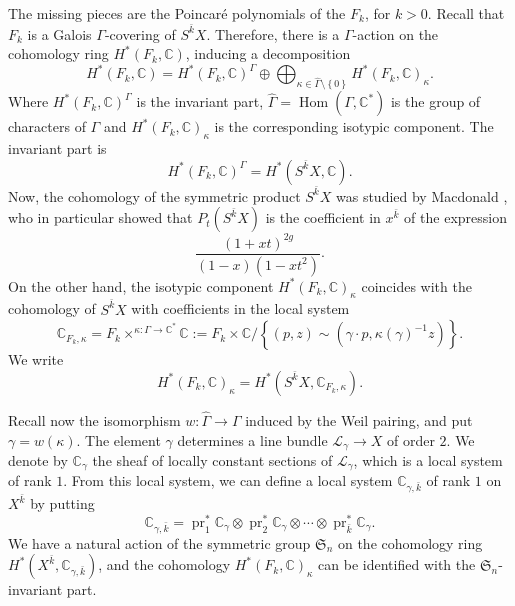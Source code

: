 \documentclass[12pt,a4paper]{amsbook}
\theoremstyle{remark} \newtheorem{rmk}[thm]{Remark}
\theoremstyle{definition} \newtheorem{defn}[thm]{Definition}
\theoremstyle{definition} \newtheorem{ex}[thm]{Example}
\theoremstyle{definition} \newtheorem{ej}{Exercise}
\newcommand{\C}{\mathbb C}
\newcommand{\sL}{\mathscr L}
\DeclareMathOperator{\Hom}{Hom}
\DeclareMathOperator{\pr}{pr}
\begin{document}
The missing pieces are the Poincaré polynomials of the $F_k$, for $k>0$. Recall that $F_k$ is a Galois $\Gamma$-covering of $S^{\bar{k}}X$. Therefore, there is a $\Gamma$-action on the cohomology ring $H^*(F_k,\C)$, inducing a decomposition
\begin{equation*}
H^*(F_k, \C) = H^*(F_k,\C)^\Gamma \oplus \bigoplus_{\kappa \in \hat{\Gamma}\setminus \left\{ 0 \right\}} H^*(F_k,\C)_{\kappa}.
\end{equation*}
Where $H^*(F_k,\C)^\Gamma$ is the invariant part, $\hat{\Gamma}=\Hom(\Gamma,\C^*)$ is the group of characters of $\Gamma$ and $H^*(F_k,\C)_{\kappa}$ is the corresponding isotypic component. The invariant part is
\begin{equation*}
H^*(F_k,\C)^\Gamma = H^*(S^{\bar{k}}X,\C).
\end{equation*}
Now, the cohomology of the symmetric product $S^{\bar{k}}X$ was studied by Macdonald \cite{Macdonald}, who in particular showed that $P_t(S^{\bar{k}}X)$ is the coefficient in $x^{\bar{k}}$ of the expression
\begin{equation} \label{eq:macdonald}
\frac{(1+xt)^{2g}}{(1-x)(1-xt^2)}.
\end{equation}
On the other hand, the isotypic component $H^*(F_k,\C)_{\kappa}$ coincides with the cohomology of $S^{\bar{k}}X$ with coefficients in the local system
\begin{equation*}
\C_{F_k,\kappa} = F_k \times^{\kappa:\Gamma \rightarrow \C^*} \C := F_k \times \C /\left\{ (p,z) \sim (\gamma\cdot p, \kappa(\gamma)^{-1} z) \right\} .
\end{equation*}
We write
\begin{equation*}
H^*(F_k,\C)_\kappa = H^*(S^{\bar{k}}X,\C_{F_k,\kappa}).
\end{equation*}

Recall now the isomorphism $w:\hat{\Gamma}\rightarrow \Gamma$ induced by the Weil pairing, and put $\gamma=w(\kappa)$. The element $\gamma$ determines a line bundle $\sL_\gamma\rightarrow X$ of order $2$. We denote by $\C_\gamma$ the sheaf of locally constant sections of $\sL_\gamma$, which is a local system of rank $1$. From this local system, we can define a local system $\C_{\gamma,\bar{k}}$ of rank $1$ on $X^{\bar{k}}$ by putting \[\C_{\gamma,\bar{k}}=\pr_1^* \C_\gamma \otimes \pr_2^* \C_\gamma \otimes\cdots \otimes \pr_{\bar{k}}^* \C_\gamma.\]
We have a natural action of the symmetric group $\mathfrak{S}_n$ on the cohomology ring $H^*(X^{\bar{k}},\C_{\gamma,\bar{k}})$, and the cohomology $H^*(F_k,\C)_\kappa$ can be identified with the $\mathfrak{S}_n$-invariant part.
\end{document}
